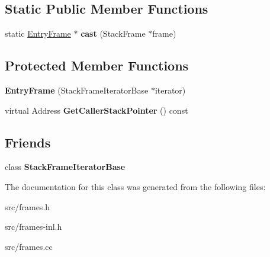 \subsection*{Static Public Member Functions}
\begin{DoxyCompactItemize}
\item 
\hypertarget{classv8_1_1internal_1_1_entry_frame_a099b83b55ccf792d0c7a9efb9b58a688}{}static \hyperlink{classv8_1_1internal_1_1_entry_frame}{Entry\+Frame} $\ast$ {\bfseries cast} (Stack\+Frame $\ast$frame)\label{classv8_1_1internal_1_1_entry_frame_a099b83b55ccf792d0c7a9efb9b58a688}

\end{DoxyCompactItemize}
\subsection*{Protected Member Functions}
\begin{DoxyCompactItemize}
\item 
\hypertarget{classv8_1_1internal_1_1_entry_frame_a785f12a4457418661ccaa5f616aac5c9}{}{\bfseries Entry\+Frame} (Stack\+Frame\+Iterator\+Base $\ast$iterator)\label{classv8_1_1internal_1_1_entry_frame_a785f12a4457418661ccaa5f616aac5c9}

\item 
\hypertarget{classv8_1_1internal_1_1_entry_frame_a3abd2acae0f490a60e9e1ddfc1affdd6}{}virtual Address {\bfseries Get\+Caller\+Stack\+Pointer} () const \label{classv8_1_1internal_1_1_entry_frame_a3abd2acae0f490a60e9e1ddfc1affdd6}

\end{DoxyCompactItemize}
\subsection*{Friends}
\begin{DoxyCompactItemize}
\item 
\hypertarget{classv8_1_1internal_1_1_entry_frame_ac7310421866976ca454bbe11c5f926c3}{}class {\bfseries Stack\+Frame\+Iterator\+Base}\label{classv8_1_1internal_1_1_entry_frame_ac7310421866976ca454bbe11c5f926c3}

\end{DoxyCompactItemize}


The documentation for this class was generated from the following files\+:\begin{DoxyCompactItemize}
\item 
src/frames.\+h\item 
src/frames-\/inl.\+h\item 
src/frames.\+cc\end{DoxyCompactItemize}
